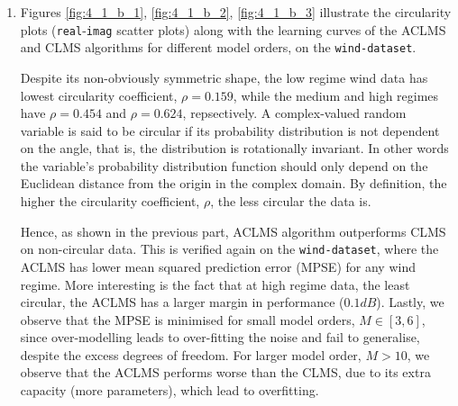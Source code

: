 \begin{enumerate}[label=\alph*), leftmargin=*]
\item
%

Figures \ref{fig:4_1_b_1}, \ref{fig:4_1_b_2}, \ref{fig:4_1_b_3} illustrate the circularity plots (\texttt{real}-\texttt{imag} scatter plots) along with the learning curves
of the ACLMS and CLMS algorithms for different model orders, on the \texttt{wind-dataset}.

Despite its non-obviously symmetric shape, the low regime wind data has lowest circularity coefficient, $\rho = 0.159$, while the medium and high regimes have
$\rho = 0.454$ and $\rho = 0.624$, repsectively. A complex-valued random variable is said to be circular if its probability distribution is not dependent on the angle, that is,
the distribution is rotationally invariant. In other words the variable’s probability distribution function should only depend on the Euclidean distance from the origin in the complex domain.
By definition, the higher the circularity coefficient, $\rho$, the less circular the data is.

Hence, as shown in the previous part, ACLMS algorithm outperforms CLMS on non-circular data. This is verified again on the \texttt{wind-dataset}, where the ACLMS has lower 
mean squared prediction error (MPSE) for any wind regime. More interesting is the fact that at high regime data, the least circular, the ACLMS has a larger margin in performance
($0.1 dB$). Lastly, we observe that the MPSE is minimised for small model orders, $M \in [3, 6]$, since over-modelling leads to over-fitting the noise and fail to generalise, despite
the excess degrees of freedom. For larger model order, $M > 10$, we observe that the ACLMS performs worse than the CLMS, due to its extra capacity (more parameters), which lead to
overfitting.


\end{enumerate}
